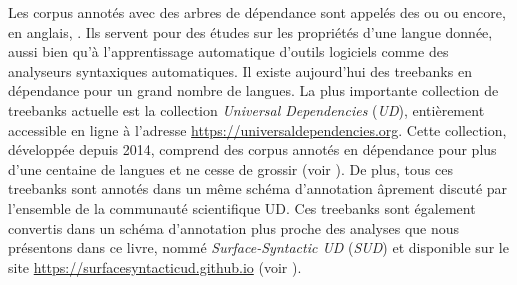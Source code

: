 {    Les corpus annotés avec des arbres de dépendance sont appelés des  ou  ou encore, en anglais, \textit{}. Ils servent pour des études sur les propriétés d’une langue donnée, aussi bien qu’à l’apprentissage automatique d’outils logiciels comme des analyseurs syntaxiques automatiques. Il existe aujourd'hui des treebanks en dépendance pour un grand nombre de langues. La plus importante collection de treebanks actuelle est la collection \textit{Universal Dependencies} (\textit{UD}), entièrement accessible en ligne à l'adresse \url{https://universaldependencies.org}. Cette collection, développée depuis 2014, comprend des corpus annotés en dépendance pour plus d'une centaine de langues et ne cesse de grossir (voir \citealt{nivre2016universal}). De plus, tous ces treebanks sont annotés dans un même schéma d'annotation âprement discuté par l'ensemble de la communauté scientifique UD. Ces treebanks sont également convertis dans un schéma d'annotation plus proche des analyses que nous présentons dans ce livre, nommé \textit{Surface-Syntactic UD} (\textit{SUD}) et disponible sur le site \url{https://surfacesyntacticud.github.io} (voir \citealt{gerdes2018sud}).
}\largerpage[2]
